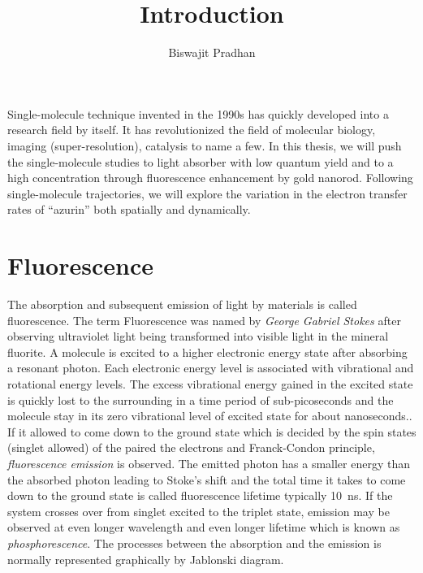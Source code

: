 \documentclass[11pt,a4paper,onecolumn]{article}
\begin{document}
\title{\textbf{Introduction}}
\author{Biswajit Pradhan}
\maketitle
Single-molecule technique invented in the 1990s has quickly developed into a research field by itself. It has revolutionized the field of molecular biology, imaging (super-resolution), catalysis to name a few. In this thesis, we will push the single-molecule studies to light absorber with low quantum yield and to a high concentration through fluorescence enhancement by gold nanorod. Following single-molecule trajectories, we will explore the variation in the electron transfer rates of ``azurin'' both spatially and dynamically.


\section{Fluorescence}
The absorption and subsequent emission of light by materials is called fluorescence.
The term Fluorescence was named by \textit{George Gabriel Stokes} after observing ultraviolet light being transformed into visible light in the mineral fluorite.\cite{Stokes1852}
A molecule is excited to a higher electronic energy state after absorbing a resonant photon.
Each electronic energy level is associated with vibrational and rotational energy levels.
The excess vibrational energy gained in the excited state is quickly lost to the surrounding in a time period of sub-picoseconds and the molecule stay in its zero vibrational level of excited state for about nanoseconds..
If it allowed to come down to the ground state which is decided by the spin states (singlet allowed) of the paired the electrons and Franck-Condon principle, \textit{fluorescence emission} is observed.
The emitted photon has a smaller energy than the absorbed photon leading to Stoke's shift and the total time it takes to come down to the ground state is called fluorescence lifetime typically \SI{10}{\ns}.
If the system crosses over from singlet excited to the triplet state, emission may be observed at even longer wavelength and even longer lifetime which is known as \textit{phosphorescence}.
The processes between the absorption and the emission is normally represented graphically by Jablonski diagram.
\end{document}
